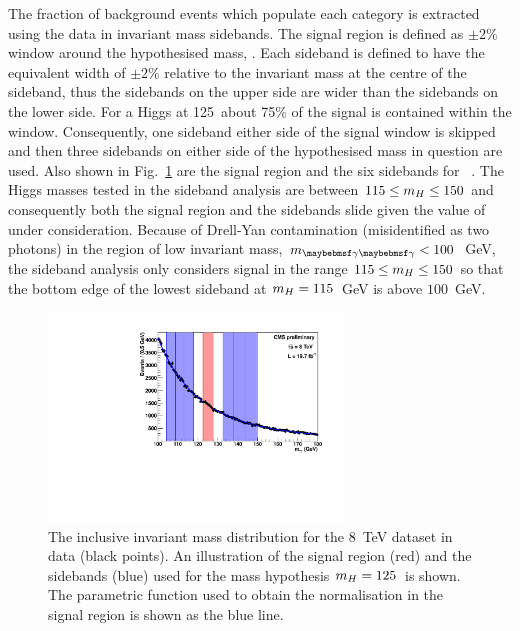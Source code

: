 The fraction of background events which populate each category is extracted using the data in invariant mass sidebands. The signal region is defined as $\pm2\%$ window around the hypothesised mass, \mH. Each sideband is defined to have the equivalent width of $\pm2\%$ relative to the invariant mass at the centre of the sideband, thus the sidebands on the upper side are wider than the sidebands on the lower side. For a \SM Higgs at 125~\GeV about 75\% of the signal is contained within the window. Consequently, one sideband either side of the signal window is skipped and then three sidebands on either side of the hypothesised mass in question are used. Also shown in Fig.~\ref{fig:sideband_norm} are the signal region and the six sidebands for ~\GeV. The Higgs masses tested in the sideband analysis are between $115 \leq m_{H} \leq 150$ and consequently both the signal region and the sidebands slide given the value of \mH under consideration. Because of Drell-Yan contamination (\Zee misidentified as two photons) in the region of low invariant mass, $\mgg<100$~GeV, the sideband analysis only considers signal in the range $115\leq m_{H} \leq 150$ so that the bottom edge of the lowest sideband at $m_{H}=115$~GeV is above $100$~GeV. 
\begin{figure}
  \begin{center}
    \includegraphics[width=0.7\textwidth]{analysis/plots/sideband/invmass.pdf}
    \caption[The invariant mass distribution for the 8~\TeV dataset]{The inclusive invariant mass distribution for the 8~TeV dataset in data (black points). An illustration of the signal region (red) and the sidebands (blue) used for the mass hypothesis $m_{H}=125$~\GeV is shown. The parametric function used to obtain the normalisation in the signal region is shown as the blue line.}
    \label{fig:sideband_norm}
  \end{center}
\end{figure}

